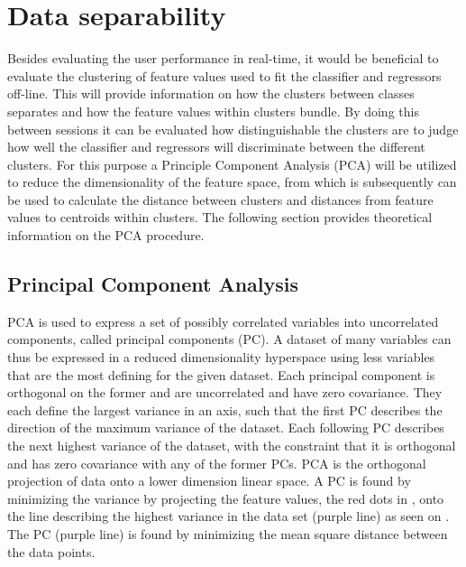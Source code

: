 \section{Data separability} \label{sec:BG:dataSeparability}
Besides evaluating the user performance in real-time, it would be beneficial to evaluate the clustering of feature values used to fit the classifier and regressors off-line. This will provide information on how the clusters between classes separates and how the feature values within clusters bundle. %
By doing this between sessions it can be evaluated how distinguishable the clusters are to judge how well the classifier and regressors will discriminate between the different clusters. For this purpose a Principle Component Analysis (PCA) will be utilized to reduce the dimensionality of the feature space, from which is subsequently can be used to calculate the distance between clusters and distances from feature values to centroids within clusters. The following section provides theoretical information on the PCA procedure. 


\subsection{Principal Component Analysis} \label{sub:BG:PCA}
PCA is used to express a set of possibly correlated variables into uncorrelated components, called principal components (PC). A dataset of many variables can thus be expressed in a reduced dimensionality hyperspace using less variables that are the most defining for the given dataset. Each principal component is orthogonal on the former and are uncorrelated and have zero covariance. They each define the largest variance in an axis, such that the first PC describes the direction of the maximum variance of the dataset. Each following PC describes the next highest variance of the dataset, with the constraint that it is orthogonal and has zero covariance with any of the former PCs. \cite{Semmlow2014}
PCA is the orthogonal projection of data onto a lower dimension linear space. A PC is found by minimizing the variance by projecting the feature values, the red dots in , onto the line describing the highest variance in the data set (purple line) as seen on . The PC (purple line) is found by minimizing the mean square distance between the data points. \cite{Semmlow2014}

